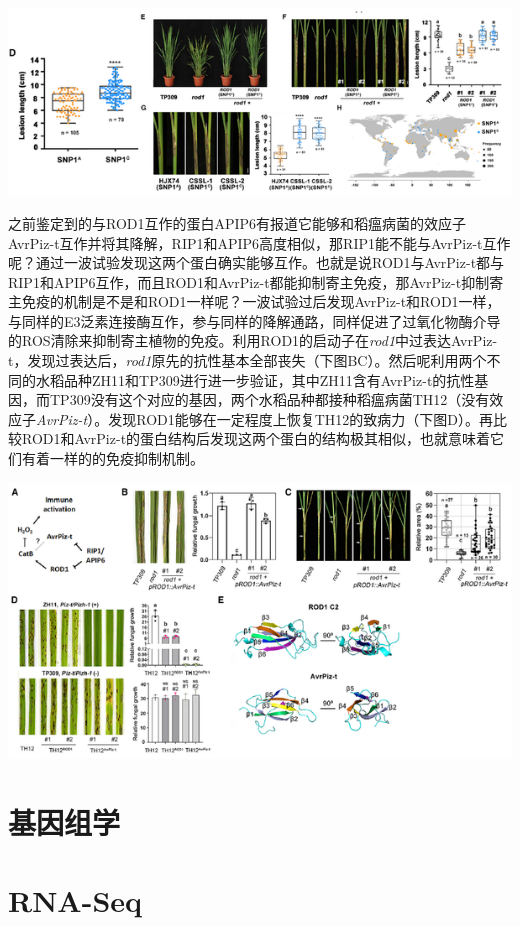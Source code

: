 \documentclass[
  10pt,
]{book}
\begin{document}
\includegraphics{figures/HeZuhuaCell2021/15.png}

之前鉴定到的与ROD1互作的蛋白APIP6有报道它能够和稻瘟病菌的效应子AvrPiz-t互作并将其降解，RIP1和APIP6高度相似，那RIP1能不能与AvrPiz-t互作呢？通过一波试验发现这两个蛋白确实能够互作。也就是说ROD1与AvrPiz-t都与RIP1和APIP6互作，而且ROD1和AvrPiz-t都能抑制寄主免疫，那AvrPiz-t抑制寄主免疫的机制是不是和ROD1一样呢？一波试验过后发现AvrPiz-t和ROD1一样，与同样的E3泛素连接酶互作，参与同样的降解通路，同样促进了过氧化物酶介导的ROS清除来抑制寄主植物的免疫。利用ROD1的启动子在\emph{rod1}中过表达AvrPiz-t，发现过表达后，\emph{rod1}原先的抗性基本全部丧失（下图BC）。然后呢利用两个不同的水稻品种ZH11和TP309进行进一步验证，其中ZH11含有AvrPiz-t的抗性基因，而TP309没有这个对应的基因，两个水稻品种都接种稻瘟病菌TH12（没有效应子\emph{AvrPiz-t}）。发现ROD1能够在一定程度上恢复TH12的致病力（下图D）。再比较ROD1和AvrPiz-t的蛋白结构后发现这两个蛋白的结构极其相似，也就意味着它们有着一样的的免疫抑制机制。

\includegraphics{figures/HeZuhuaCell2021/16.png}

\hypertarget{liter-genomics}{%
\chapter{基因组学}\label{liter-genomics}}

\hypertarget{liter-rnaseq}{%
\chapter{RNA-Seq}\label{liter-rnaseq}}
\end{document}
